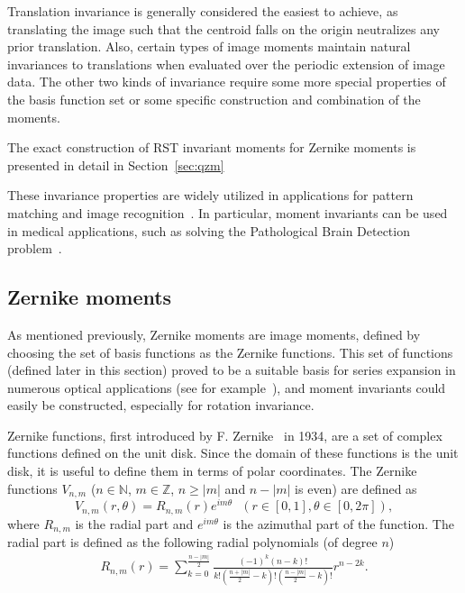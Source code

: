Translation invariance is generally considered the easiest to achieve, as translating the image such that the centroid falls on the origin neutralizes any prior translation. Also, certain types of image moments maintain natural invariances to translations when evaluated over the periodic extension of image data. The other two kinds of invariance require some more special properties of the basis function set or some specific construction and combination of the moments.


The exact construction of RST invariant moments for Zernike moments is presented in detail in Section~\ref{sec:qzm}


These invariance properties are widely utilized in applications for pattern matching and image recognition~\cite{app1, app2, app3}. In particular, moment invariants can be used in medical applications, such as solving the Pathological Brain Detection problem~\cite{med_app_1}.


\subsection{Zernike moments}
As mentioned previously, Zernike moments are image moments, defined by choosing the set of basis functions as the Zernike functions. This set of functions (defined later in this section) proved to be a suitable basis for series expansion in numerous optical applications (see for example~\cite{wavefront,optical_human_eye,opt_surf}), and moment invariants could easily be constructed, especially for rotation invariance.


Zernike functions, first introduced by F. Zernike~\cite{zernike} in 1934, are a set of complex functions defined on the unit disk. Since the domain of these functions is the unit disk, it is useful to define them in terms of polar coordinates. The Zernike functions $V_{n,m}$ ($n \in \mathds{N}$, $m \in \mathds{Z}$, $n \geq |m|$ and $n - |m|$ is even) are defined as
\begin{equation}\label{ZernikeFunction}
  V_{n,m}(r,\theta) = R_{n,m}(r) e^{i m\theta} \ \ \ (r\in[0,1], \theta\in[0,2\pi]),
\end{equation}
where $R_{n,m}$ is the radial part and $e^{i m\theta}$ is the azimuthal part of the function. The radial part is defined as the following radial polynomials (of degree $n$)
\begin{gather}
    R_{n,m}(r) = \sum_{k=0}^{\frac{n - |m|}{2}}\frac{(-1)^k (n - k)!}{k!\left(\frac{n + |m|}{2} - k\right)!\left(\frac{n - |m|}{2} - k\right)!}r^{n-2k} \label{eq:radial_poly}.
\end{gather} 


